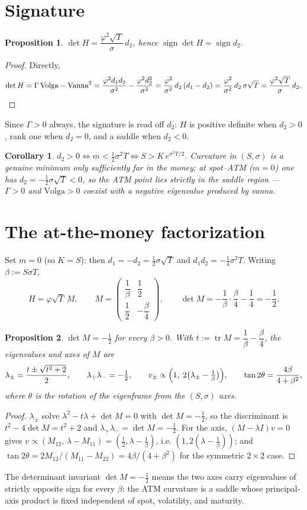 \documentclass[11pt]{article}
\newtheorem{proposition}{Proposition}
\newtheorem{corollary}{Corollary}
\begin{document}
\section{Signature}
\begin{proposition}\label{prop:sig}
$\det H=\dfrac{\varphi^2\sqrt T}{\sigma}\,d_2$, hence $\operatorname{sign}\det H=\operatorname{sign} d_2$.
\end{proposition}
\begin{proof}
Directly,
\[
\det H=\Gamma\,\text{Volga}-\text{Vanna}^2
=\frac{\varphi^2 d_1 d_2}{\sigma^2}-\frac{\varphi^2 d_2^2}{\sigma^2}
=\frac{\varphi^2}{\sigma^2}\,d_2\,(d_1-d_2)
=\frac{\varphi^2}{\sigma^2}\,d_2\,\sigma\sqrt T
=\frac{\varphi^2\sqrt T}{\sigma}\,d_2. \qedhere
\]
\end{proof}
Since $\Gamma>0$ always, the signature is read off $d_2$: $H$ is positive definite when $d_2>0$,
rank one when $d_2=0$, and a saddle when $d_2<0$.
\begin{corollary}
$d_2>0\iff m<\tfrac12\sigma^2T\iff S>K\,e^{\sigma^2T/2}$. Curvature in $(S,\sigma)$ is a genuine
minimum only sufficiently far in the money; at spot--ATM ($m=0$) one has $d_2=-\tfrac12\sigma\sqrt T<0$,
so the ATM point lies strictly in the saddle region --- $\Gamma>0$ and $\text{Volga}>0$ coexist with a
negative eigenvalue produced by vanna.
\end{corollary}

\section{The at-the-money factorization}
Set $m=0$ (so $K=S$): then $d_1=-d_2=\tfrac12\sigma\sqrt T$ and $d_1d_2=-\tfrac14\sigma^2T$. Writing
$\beta:=S\sigma T$,
\[
H=\varphi\sqrt T\,M,\qquad
M=\begin{pmatrix}\dfrac1\beta&\dfrac12\\[6pt]\dfrac12&-\dfrac\beta4\end{pmatrix},\qquad
\det M=-\frac1\beta\cdot\frac\beta4-\frac14=-\frac12 .
\]
\begin{proposition}\label{prop:eig}
$\det M=-\tfrac12$ for every $\beta>0$. With $t:=\operatorname{tr}M=\dfrac1\beta-\dfrac\beta4$, the
eigenvalues and axes of $M$ are
\[
\lambda_\pm=\frac{t\pm\sqrt{t^2+2}}{2},\qquad
\lambda_+\lambda_-=-\tfrac12,\qquad
v_\pm\propto\Bigl(1,\;2\bigl(\lambda_\pm-\tfrac1\beta\bigr)\Bigr),\qquad
\tan2\theta=\frac{4\beta}{4+\beta^2},
\]
where $\theta$ is the rotation of the eigenframe from the $(S,\sigma)$ axes.
\end{proposition}
\begin{proof}
$\lambda_\pm$ solve $\lambda^2-t\lambda+\det M=0$ with $\det M=-\tfrac12$, so the discriminant is
$t^2-4\det M=t^2+2$ and $\lambda_+\lambda_-=\det M=-\tfrac12$. For the axis, $(M-\lambda I)v=0$ gives
$v\propto(M_{12},\,\lambda-M_{11})=(\tfrac12,\lambda-\tfrac1\beta)$, i.e. $(1,2(\lambda-\tfrac1\beta))$;
and $\tan2\theta=2M_{12}/(M_{11}-M_{22})=4\beta/(4+\beta^2)$ for the symmetric $2\times2$ case.
\end{proof}
The determinant invariant $\det M=-\tfrac12$ means the two axes carry eigenvalues of strictly opposite
sign for every $\beta$: the ATM curvature is a saddle whose principal-axis product is fixed independent
of spot, volatility, and maturity.
\end{document}
